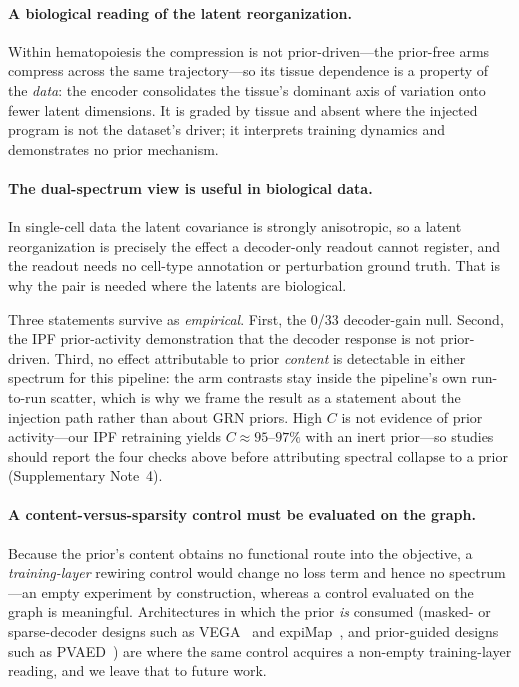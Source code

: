\documentclass[11pt,a4paper]{article}
\begin{document}
\paragraph*{A biological reading of the latent reorganization.}
Within hematopoiesis the compression is not prior-driven---the prior-free arms compress across the
same trajectory---so its tissue dependence is a property of the \emph{data}: the encoder
consolidates the tissue's dominant axis of variation onto fewer latent dimensions. It is graded by
tissue and absent where the injected program is not the dataset's driver; it interprets training
dynamics and demonstrates no prior mechanism.

\paragraph*{The dual-spectrum view is useful in biological data.}
In single-cell data the latent covariance is strongly anisotropic, so a latent reorganization is
precisely the effect a decoder-only readout cannot register, and the readout needs no cell-type
annotation or perturbation ground truth. That is why the pair is needed where the latents are
biological.

Three statements survive as \emph{empirical}. First, the 0/33 decoder-gain null. Second, the IPF prior-activity demonstration that the decoder response is not prior-driven. Third, no effect attributable to prior \emph{content} is detectable in either spectrum for this pipeline: the arm contrasts stay inside the pipeline's own run-to-run scatter, which is why we frame the result as a statement about the injection path rather than about GRN priors. High $C$ is not evidence of prior activity---our IPF retraining yields $C\approx95$--$97\%$ with an inert prior---so studies should report the four checks above before attributing spectral collapse to a prior (Supplementary Note~4).

\paragraph*{A content-versus-sparsity control must be evaluated on the graph.}
Because the prior's content obtains no functional route into the objective, a
\emph{training-layer} rewiring control would change no loss term and hence no spectrum---an empty
experiment by construction, whereas a control evaluated on the graph is meaningful. Architectures in which the prior \emph{is} consumed (masked- or sparse-decoder designs such as VEGA~\cite{vega} and expiMap~\cite{expimap2023}, and prior-guided designs such as PVAED~\cite{pvaed2026}) are where the same control acquires a non-empty training-layer reading, and we leave that to future work.
\end{document}
